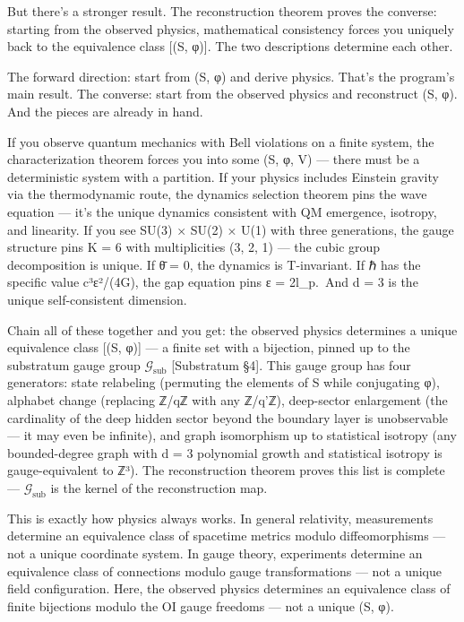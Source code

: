 \documentclass[
]{article}
\begin{document}
But there's a stronger result. The reconstruction theorem proves the
converse: starting from the observed physics, mathematical consistency
forces you uniquely back to the equivalence class {[}(S, φ){]}. The two
descriptions determine each other.

The forward direction: start from (S, φ) and derive physics. That's the
program's main result. The converse: start from the observed physics and
reconstruct (S, φ). And the pieces are already in hand.

If you observe quantum mechanics with Bell violations on a finite
system, the characterization theorem forces you into some (S, φ, V) ---
there must be a deterministic system with a partition. If your physics
includes Einstein gravity via the thermodynamic route, the dynamics
selection theorem pins the wave equation --- it's the unique dynamics
consistent with QM emergence, isotropy, and linearity. If you see SU(3)
× SU(2) × U(1) with three generations, the gauge structure pins K = 6
with multiplicities (3, 2, 1) --- the cubic group decomposition is
unique. If θ̄ = 0, the dynamics is T-invariant. If ℏ has the specific
value c³ε²/(4G), the gap equation pins ε = 2l\_p.~And d = 3 is the
unique self-consistent dimension.

Chain all of these together and you get: the observed physics determines
a unique equivalence class {[}(S, φ){]} --- a finite set with a
bijection, pinned up to the substratum gauge group
\(\mathcal{G}_{\text{sub}}\) {[}Substratum §4{]}. This gauge group has
four generators: state relabeling (permuting the elements of S while
conjugating φ), alphabet change (replacing ℤ/qℤ with any ℤ/q'ℤ),
deep-sector enlargement (the cardinality of the deep hidden sector
beyond the boundary layer is unobservable --- it may even be infinite),
and graph isomorphism up to statistical isotropy (any bounded-degree
graph with d = 3 polynomial growth and statistical isotropy is
gauge-equivalent to ℤ³). The reconstruction theorem proves this list is
complete --- \(\mathcal{G}_{\text{sub}}\) is the kernel of the
reconstruction map.

This is exactly how physics always works. In general relativity,
measurements determine an equivalence class of spacetime metrics modulo
diffeomorphisms --- not a unique coordinate system. In gauge theory,
experiments determine an equivalence class of connections modulo gauge
transformations --- not a unique field configuration. Here, the observed
physics determines an equivalence class of finite bijections modulo the
OI gauge freedoms --- not a unique (S, φ).
\end{document}
